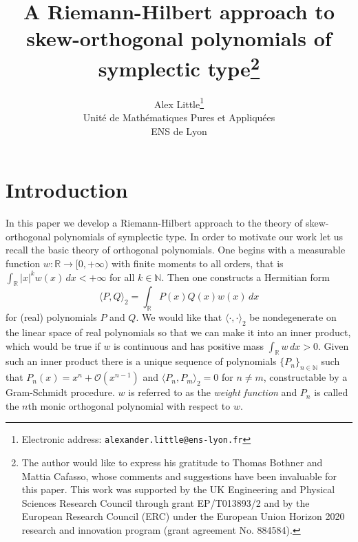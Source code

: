 \documentclass[12pt]{article}
\theoremstyle{definition}
\begin{document}
\title{A Riemann-Hilbert approach to skew-orthogonal polynomials of symplectic type\thanks{The author would like to express his gratitude to Thomas Bothner and Mattia Cafasso, whose comments and suggestions have been invaluable for this paper. This work was supported by the UK Engineering and Physical Sciences Research Council through grant EP/T013893/2 and by the European Research Council (ERC) under the European Union Horizon 2020 research and innovation program (grant agreement No. 884584).}}
\author{Alex Little\thanks{Electronic address: \texttt{alexander.little@ens-lyon.fr}}\\
Unité de Mathématiques Pures et Appliquées\\ ENS de Lyon}



\maketitle




\tableofcontents
\newpage

\section{Introduction}

In this paper we develop a Riemann-Hilbert approach to the theory of skew-orthogonal polynomials of symplectic type.  In order to motivate our work let us recall the basic theory of orthogonal polynomials.  One begins with a measurable function $w : \mathbb{R}\to [0,+\infty)$ with finite moments to all orders, that is $\int_\mathbb{R} |x|^k w(x) \, dx < +\infty$ for all $k \in \mathbb{N}$.  Then one constructs a Hermitian form
$$\langle P, Q \rangle_2 = \int_\mathbb{R} P(x)Q(x) w(x) \, dx$$
for (real) polynomials $P$ and $Q$.  We would like that $\langle \cdot ,  \cdot \rangle_2$ be nondegenerate on the linear space of real polynomials so that we can make it into an inner product,  which would be true if $w$ is continuous and has positive mass $\int_\mathbb{R} w \, dx > 0$.  Given such an inner product there is a unique sequence of polynomials $\{ P_n \}_{n \in \mathbb{N}}$ such that $P_n(x) = x^n + \mathcal{O}(x^{n-1})$ and $\langle P_n , P_m \rangle_2 = 0$ for $n \neq m$, constructable by a Gram-Schmidt procedure.  $w$ is referred to as the \textit{weight function} and $P_n$ is called the $n$th monic orthogonal polynomial with respect to $w$. 
\end{document}

